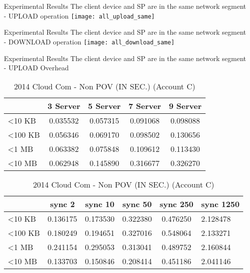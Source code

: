 \begin{frame}{Experimental Results}
{The client device and SP are in the same network segment - UPLOAD operation}
	\texttt{[image: all\_upload\_same]}
\end{frame}

\begin{frame}{Experimental Results}
{The client device and SP are in the same network segment - DOWNLOAD operation}
	\texttt{[image: all\_download\_same]}
\end{frame}

\begin{frame}{Experimental Results}
{The client device and SP are in the same network segment - UPLOAD Overhead}
	\scriptsize
    \begin{table}[]
    \centering
    \caption{My Method - Non POV (IN SEC.) (Account C)}
    \begin{tabular}{lcccc}
     					 & 3 Server & 5 Server & 7 Server & 9 Server \\ \hline
        \textless 10 KB  & 0.035532 & 0.057315 & 0.091068 & 0.098088 \\ \hline
        \textless 100 KB & 0.056346 & 0.069170 & 0.098502 & 0.130656 \\ \hline
        \textless 1 MB   & 0.063382 & 0.075848 & 0.109612 & 0.113430 \\ \hline
        \textless 10 MB  & 0.062948 & 0.145890 & 0.316677 & 0.326270 \\ \hline
    \end{tabular}
    \caption{2014 Cloud Com - Non POV (IN SEC.) (Account C)}
    \begin{tabular}{lccccl}
       					 & sync 2   & sync 10  & sync 50  & sync 250 & sync 1250 \\ \hline
        \textless 10 KB  & 0.136175 & 0.173530 & 0.322380 & 0.476250 & 2.128478  \\ \hline
        \textless 100 KB & 0.180249 & 0.194651 & 0.327016 & 0.548064 & 2.133271  \\ \hline
        \textless 1 MB   & 0.241154 & 0.295053 & 0.313041 & 0.489752 & 2.160844  \\ \hline
        \textless 10 MB  & 0.133703 & 0.150846 & 0.208414 & 0.451186 & 2.041146  \\ \hline
    \end{tabular}
    \end{table}
\end{frame}

